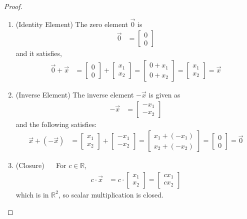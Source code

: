 \begin{proof}
\begin{enumerate}
\item (Identity Element)  The zero element $\vec{0}$ is 
% 
\begin{align*}
 \vec{0} & = 
\begin{bmatrix}
 0 \\ 0 
\end{bmatrix}
\end{align*}
%
and it satisfies,
%
\begin{align*}
 \vec{0} + \vec{x} & = 
\begin{bmatrix}
 0 \\ 0 
\end{bmatrix} + 
\begin{bmatrix}
 x_1 \\ x_2 
\end{bmatrix} = 
\begin{bmatrix}
 0 + x_1 \\ 0 + x_2 
\end{bmatrix} = 
\begin{bmatrix}
 x_1 \\ x_2 
\end{bmatrix} = \vec{x} 
\end{align*}

\item (Inverse Element) The inverse element $-\vec{x}$ is given as 
% 
\begin{align*}
 -\vec{x} & = 
\begin{bmatrix}
 -x_1 \\ -x_2
\end{bmatrix}
\end{align*}
%
and the following satisfies:
% 
\begin{align*}
 \vec{x} + (-\vec{x}) & = 
\begin{bmatrix}
 x_1 \\ x_2 
\end{bmatrix} + 
\begin{bmatrix}
 -x_1 \\ -x_2 
\end{bmatrix}
= 
\begin{bmatrix}
 x_1 + (-x_1) \\ x_2 + (-x_2) 
\end{bmatrix} = 
\begin{bmatrix}
 0 \\ 0 
\end{bmatrix} = \vec{0} 
\end{align*}

\item (Closure) ~~ For $c \in \mathbb{R}$, 
%
\begin{align*}
c \cdot \vec{x} & = c \cdot  \begin{bmatrix}
x_1 \\ x_2 
\end{bmatrix} = \begin{bmatrix}
cx_1 \\ cx_2 
\end{bmatrix}
\end{align*}
which is in $\mathbb{R}^2$, so scalar multiplication is closed.  


\end{enumerate}
\end{proof}
